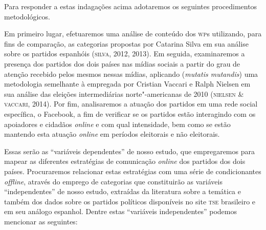 Para responder a estas indagações acima adotaremos os seguintes
procedimentos metodológicos.

Em primeiro lugar, efetuaremos uma análise de conteúdo dos \textsc{wp}s
utilizando, para fins de comparação, as categorias propostas por
Catarina Silva em sua análise sobre os partidos espanhóis (\textsc{silva}, 2012,
2013). Em seguida, examinaremos a presença dos partidos dos dois países
nas mídias sociais a partir do grau de atenção recebido pelos
mesmos nessas mídias, aplicando (\emph{mutatis mutandis}) uma
metodologia semelhante à empregada por Cristian Vaccari e Ralph Nielsen
em sua análise das eleições intermediárias norte"-americanas de 2010
(\textsc{nielsen \& vaccari}, 2014). Por fim, analisaremos a atuação dos partidos
em uma rede social específica, o Facebook, a fim de verificar se os
partidos estão interagindo com os apoiadores e cidadãos \emph{online} e com
qual intensidade, bem como se estão mantendo esta atuação \emph{online} em
períodos eleitorais e não eleitorais.

Essas serão as ``variáveis dependentes'' de nosso estudo, que
empregaremos para mapear as diferentes estratégias de comunicação
\emph{online} dos partidos dos dois países. Procuraremos relacionar estas
estratégias com uma série de condicionantes \emph{offline}, através do
emprego de categorias que constituirão as variáveis ``independentes'' de
nosso estudo, extraídas da literatura sobre a temática e também dos
dados sobre os partidos políticos disponíveis no site \textsc{tse} brasileiro e
em seu análogo espanhol. Dentre estas ``variáveis independentes''
podemos mencionar as seguintes:

